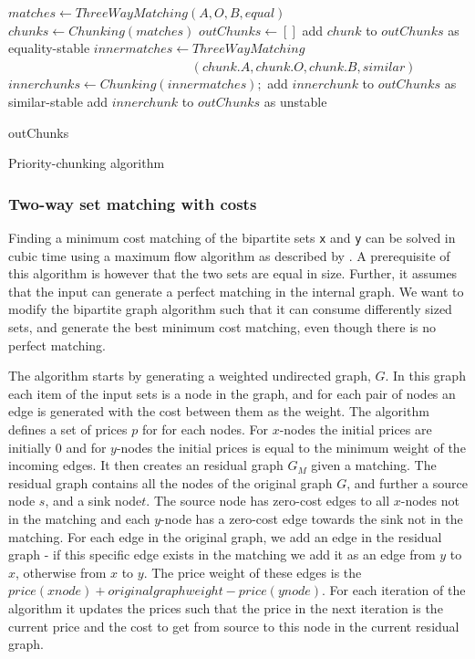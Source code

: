 \documentclass[11pt]{article}
\begin{document}
\begin{algorithm}
\begin{algorithmic}
	\State $matches \gets ThreeWayMatching(A, O, B, equal)$
	\State $chunks \gets Chunking(matches)$
	\State $outChunks \gets []$
			\State add $chunk$ to $outChunks$ as equality-stable
		\Else
			\State $innermatches \gets ThreeWayMatching $
			\State ~~~~~~~~~~~~~~~~~~~~~~~~~~~~ $ (chunk.A, chunk.O, chunk.B, similar)$
            \State $innerchunks \gets Chunking(innermatches);$
					\State add $innerchunk$ to $outChunks$ as similar-stable
				\Else
					\State add $innerchunk$ to $outChunks$ as unstable
				\EndIf
			\EndFor
		\EndIf
	\EndFor


	\State \Return outChunks
\EndFunction
\end{algorithmic}
	\caption{Priority-chunking algorithm}
	\label{PriorityChunk}
\end{algorithm}


\subsubsection{Two-way set matching with costs}
Finding a minimum cost matching of the bipartite sets \texttt{x} and \texttt{y} can be solved in cubic time using a maximum flow algorithm as described by \citet{bipartitecost}. A prerequisite of this algorithm is however that the two sets are equal in size. Further, it assumes that the input can generate a perfect matching in the internal graph. We want to modify the bipartite graph algorithm such that it can consume differently sized sets, and generate the best minimum cost matching, even though there is no perfect matching.

The \citet{bipartitecost} algorithm starts by generating a weighted undirected graph, $G$. In this graph each item of the input sets is a node in the graph, and for each pair of nodes an edge is generated with the cost between them as the weight. The algorithm defines a set of prices $p$ for for each nodes. For $x$-nodes the initial prices are initially 0 and for $y$-nodes the initial prices is equal to the minimum weight of the incoming edges. It then creates an residual graph $G_M$ given a matching. The residual graph contains all the nodes of the original graph $G$, and further a source node $s$, and a sink node$t$. The source node has zero-cost edges to all $x$-nodes not in the matching and each $y$-node has a zero-cost edge towards the sink not in the matching. For each edge in the original graph, we add an edge in the residual graph - if this specific edge exists in the matching we add it as an edge from $y$ to $x$, otherwise from $x$ to $y$. The price weight of these edges is the $price(xnode)+originalgraphweight-price(ynode)$. For each iteration of the algorithm it updates the prices such that the price in the next iteration is the current price and the cost to get from source to this node in the current residual graph.
\end{document}
